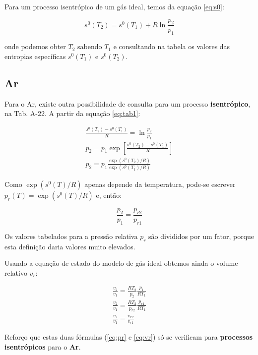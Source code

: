 Para um processo isentrópico de um gás ideal, temos da equação \ref{eq:s0}: 

\begin{equation} \label{eq:tab1}
    s^0(T_2) = s^0(T_1) + R \ln \frac{p_2}{p_1}
\end{equation}

onde podemos obter $T_2$ sabendo $T_1$ e consultando na tabela os valores das entropias específicas $s^0(T_1)$ e $s^0(T_2)$.

\subsection{Ar}

Para o Ar, existe outra possibilidade de consulta para um processo \textbf{isentrópico}, na Tab. A-22. A partir da equação \ref{eq:tab1}:

\begin{eqnarray}
    \frac{s^0(T_2) - s^0(T_1)}{R} = \ln \frac{p_2}{p_1} \nonumber \\
    p_2 = p_1 \exp \left[\frac{s^0(T_2) - s^0(T_1)}{R} \right] \nonumber \\
    p_2 = p_1 \frac{\exp(s^0(T_2)/R)}{\exp(s^0(T_1)/R)}
\end{eqnarray}

Como $\exp(s^0(T)/R)$ apenas depende da temperatura, pode-se escrever $p_r(T) = \exp(s^0(T)/R)$ e, então:

\begin{equation} \label{eq:pr}
    \frac{p_2}{p_1} = \frac{p_{r2}}{p_{r1}} 
\end{equation}

Os valores tabelados para a pressão relativa $p_r$ são divididos por um fator, porque esta definição daria valores muito elevados.

Usando a equação de estado do modelo de gás ideal obtemos ainda o volume relativo $v_r$:

\begin{eqnarray}
    \frac{v_2}{v_1} = \frac{RT_2}{p_2} \frac{p_1}{RT_1} \nonumber  \\
    \frac{v_2}{v_1} = \frac{RT_2}{p_{r2}} \frac{p_{r1}}{RT_1} \nonumber \\
    \frac{v_2}{v_1} = \frac{v_{r2}}{v_{r1}}  \label{eq:vr}
\end{eqnarray}

Reforço que estas duas fórmulas (\ref{eq:pr} e \ref{eq:vr}) só se verificam para \textbf{processos isentrópicos} para o \textbf{Ar}.

